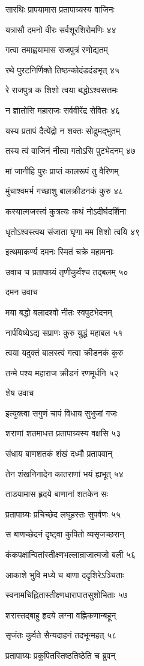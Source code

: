 सारथिः प्रापयामास प्रतापाग्र्यस्य वाजिनः

यत्रासौ दमनो वीरः सर्वशूरशिरोमणिः ४४

गत्वा तमाह्वयामास राजपुत्रं रणोद्यतम्

रथे पुरटनिर्णिक्ते तिष्ठन्कोदंडदंडभृत् ४५

रे राजपुत्र क शिशो त्वया बद्धोऽश्वसत्तमः

न ज्ञातोसि महाराजः सर्ववीरेंद्र सेवितः ४६

यस्य प्रतापं दैत्येंद्रो न शक्तः सोढुमद्भुतम्

तस्य त्वं वाजिनं नीत्वा गतोऽसि पुटभेदनम् ४७

मां जानीहि पुरः प्राप्तं कालरूपं तु वैरिणम्

मुंचाश्वमर्भ गच्छाशु बालक्रीडनकं कुरु ४८

कस्यात्मजस्त्वं कुत्रत्यः कथं नोऽदीर्घदर्शिना

धृतोऽश्वस्त्वथ संजाता घृणा मम शिशो त्वयि ४९

इत्थमाकर्ण्य दमनः स्मितं चक्रे महामनाः

उवाच च प्रतापाग्र्यं तृणीकुर्वंश्च तद्बलम् ५०

दमन उवाच

मया बद्धो बलादश्वो नीतः स्वपुटभेदनम्

नार्पयिष्येऽद्य सप्राणः कुरु युद्धं महाबल ५१

त्वया यदुक्तं बालस्त्वं गत्वा क्रीडनकं कुरु

तन्मे पश्य महाराज क्रीडनं रणमूर्धनि ५२

शेष उवाच

इत्युक्त्वा सगुणं चापं विधाय सुभुजां गजः

शराणां शतमाधत्त प्रतापाग्र्यस्य वक्षसि ५३

संधाय बाणशतकं शंखं दध्मौ प्रतापवान्

तेन शंखनिनादेन कातराणां भयं ह्यभूत् ५४

ताडयामास हृदये बाणानां शतकेन सः

प्रतापाग्र्यः प्रचिच्छेद लघुहस्तः सुपर्वणः ५५

स बाणच्छेदनं दृष्ट्वा कुपितो व्यसृजच्छरान्

कंकपक्षान्वितांस्तीक्ष्णभल्लान्राजात्मजो बली ५६

आकाशे भुवि मध्ये च बाणा ददृशिरेऽञ्चिताः

स्वनामचिह्नितास्तीक्ष्णधारापातसुशोभिताः ५७

शरास्तद्बाहु हृदये लग्ना वह्निकणान्बहून्

सृजंतः कुर्वते सैन्यदाहनं तदभून्महत् ५८

प्रतापाग्र्यः प्रकुपितस्तिष्ठतिष्ठेति च ब्रुवन्

